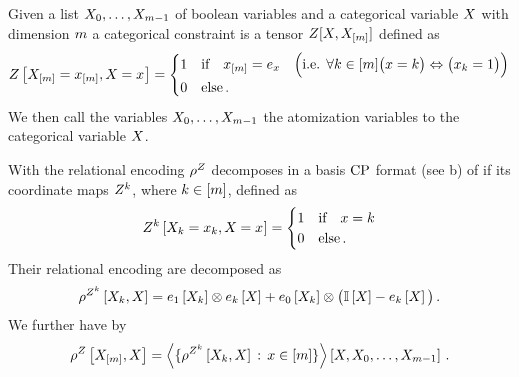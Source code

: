\begin{definition}
	Given a list $X_{0},\ldots,X_{m-1}$ of boolean variables and a categorical variable $X$ with dimension $m$ a categorical constraint is a tensor $Z[X,X_{[m]}]$ defined as
	\begin{align*}
		Z\left[X_{[m]}=x_{[m]},X_{}=x_{}\right]
		 = \begin{cases}
		 	1 & \text{if} \quad x_{[m]} = e_{x} \quad \Big(\text{i.e. }\forall k\in[m] \big(x=k\big) \Leftrightarrow \big(x_{k}=1\big) \Big)\\
			0 & \text{else} \, .
		 \end{cases}
	\end{align*}
	We then call the variables  $X_{0},\ldots,X_{m-1}$ the atomization variables to the categorical variable $X$.
\end{definition}

With  the relational encoding $\rho^{Z}$ decomposes in a basis $\mathrm{CP}$ format (see b) of if its coordinate maps $Z^{k}$, where $k\in[m]$, defined as
\begin{align*}
	Z^{k}\left[X_{k}=x_{k},X_{}=x_{}\right]
	= \begin{cases}
		  1 & \text{if} \quad x=k \\
		  0 & \text{else} \, .
	\end{cases}
\end{align*}
Their relational encoding are decomposed as
\begin{align}
	\rho^{Z^{k}}\left[X_{k},X\right]
	= e_{1}\left[X_{k}\right] \otimes e_{k}\left[X\right]
	+ e_{0}\left[X_{k}\right] \otimes \big(\mathbb{I}\left[X\right]- e_{k}\left[X\right]\big) \, .
\end{align}
We further have by 
\begin{align*}
	\rho^{Z}\left[X_{[m]},X\right]
	= \left\langle \{\rho^{Z^{k}}\left[X_{k},X\right] \, : \, x\in[m]\}\right\rangle \left[ X, X_{0}, \ldots, X_{m-1} \right] \, .
\end{align*}


